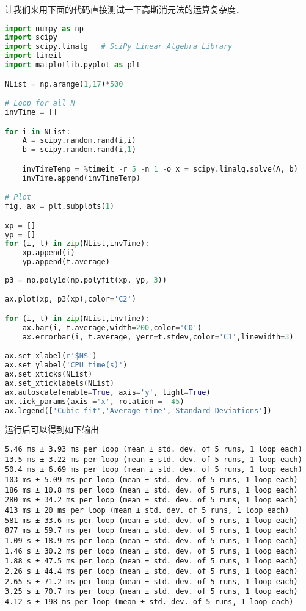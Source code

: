让我们来用下面的代码直接测试一下高斯消元法的运算复杂度．
\begin{lstlisting}[language=python]
import numpy as np
import scipy
import scipy.linalg   # SciPy Linear Algebra Library
import timeit
import matplotlib.pyplot as plt

NList = np.arange(1,17)*500

# Loop for all N
invTime = []

for i in NList:
    A = scipy.random.rand(i,i)
    b = scipy.random.rand(i,1)

    invTimeTemp = %timeit -r 5 -n 1 -o x = scipy.linalg.solve(A, b)
    invTime.append(invTimeTemp)

# Plot
fig, ax = plt.subplots(1)

xp = []
yp = []
for (i, t) in zip(NList,invTime):
    xp.append(i)
    yp.append(t.average)
    
p3 = np.poly1d(np.polyfit(xp, yp, 3))

ax.plot(xp, p3(xp),color='C2')

for (i, t) in zip(NList,invTime):
    ax.bar(i, t.average,width=200,color='C0')
    ax.errorbar(i, t.average, yerr=t.stdev,color='C1',linewidth=3)

ax.set_xlabel(r'$N$')
ax.set_ylabel('CPU time(s)')
ax.set_xticks(NList)
ax.set_xticklabels(NList)
ax.autoscale(enable=True, axis='y', tight=True)
ax.tick_params(axis ='x', rotation = -45) 
ax.legend(['Cubic fit','Average time','Standard Deviations'])
\end{lstlisting}

运行后可以得到如下输出

\begin{lstlisting}[language={}]
5.46 ms ± 3.93 ms per loop (mean ± std. dev. of 5 runs, 1 loop each)
13.5 ms ± 3.22 ms per loop (mean ± std. dev. of 5 runs, 1 loop each)
50.4 ms ± 6.69 ms per loop (mean ± std. dev. of 5 runs, 1 loop each)
103 ms ± 5.09 ms per loop (mean ± std. dev. of 5 runs, 1 loop each)
186 ms ± 10.8 ms per loop (mean ± std. dev. of 5 runs, 1 loop each)
280 ms ± 34.2 ms per loop (mean ± std. dev. of 5 runs, 1 loop each)
413 ms ± 20 ms per loop (mean ± std. dev. of 5 runs, 1 loop each)
581 ms ± 33.6 ms per loop (mean ± std. dev. of 5 runs, 1 loop each)
877 ms ± 59.7 ms per loop (mean ± std. dev. of 5 runs, 1 loop each)
1.09 s ± 18.9 ms per loop (mean ± std. dev. of 5 runs, 1 loop each)
1.46 s ± 30.2 ms per loop (mean ± std. dev. of 5 runs, 1 loop each)
1.88 s ± 47.5 ms per loop (mean ± std. dev. of 5 runs, 1 loop each)
2.26 s ± 44.4 ms per loop (mean ± std. dev. of 5 runs, 1 loop each)
2.65 s ± 71.2 ms per loop (mean ± std. dev. of 5 runs, 1 loop each)
3.25 s ± 70.7 ms per loop (mean ± std. dev. of 5 runs, 1 loop each)
4.12 s ± 198 ms per loop (mean ± std. dev. of 5 runs, 1 loop each)
\end{lstlisting}

